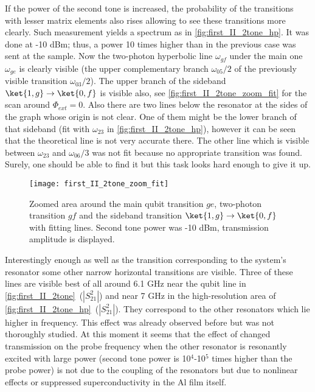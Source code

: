 If the power of the second tone is increased, the probability of the transitions with lesser matrix elements also rises allowing to see these transitions more clearly. Such measurement yields a spectrum as in \autoref{fig:first_II_2tone_hp}. It was done at -10 dBm; thus, a power 10 times higher than in the previous case was sent at the sample. Now the two-photon hyperbolic line $\omega_{gf}$ under the main one $\omega_{ge}$ is clearly visible (the upper complementary branch $\omega_{05}/2$ of the previously visible transition $\omega_{03}/2$). The upper branch of the sideband $\ket{1,g}\rightarrow \ket{0,f}$ is visible also, see \autoref{fig:first_II_2tone_zoom_fit} for the scan around $\Phi_{ext}=0$. Also there are two lines below the resonator at the sides of the graph whose origin is not clear. One of them might be the lower branch of that sideband (fit with $\omega_{23}$ in \autoref{fig:first_II_2tone_hp}), however it can be seen that the theoretical line is not very accurate there. The other line which is visible between $\omega_{23}$ and $\omega_{06}/3$ was not fit because no appropriate transition was found. Surely, one should be able to find it but this task looks hard enough to give it up.

	
\begin{figure}
\centering
\texttt{[image: first\_II\_2tone\_zoom\_fit]}
\caption{Zoomed area around the main qubit transition $ge$, two-photon transition $gf$ and the sideband transition $\ket{1,g}\rightarrow \ket{0,f}$ with fitting lines. Second tone power was -10 dBm, transmission amplitude is displayed.}
\label{fig:first_II_2tone_zoom_fit}
\end{figure}

Interestingly enough as well as the transition corresponding to the system's resonator some other narrow horizontal transitions are visible. Three of these lines are visible best of all around 6.1 GHz near the qubit line in \autoref{fig:first_II_2tone}~($|S^2_{21}|$) and near 7 GHz in the high-resolution area of \autoref{fig:first_II_2tone_hp}~($|S^2_{21}|$). They correspond to the other resonators which lie higher in frequency. This effect was already observed before but was not thoroughly studied. At this moment it seems that the effect of changed transmission on the probe frequency when the other resonator is resonantly excited with large power (second tone power is 10$^4$-10$^5$ times higher than the probe power) is not due to the coupling of the resonators but due to nonlinear effects or suppressed superconductivity in the Al film itself.

